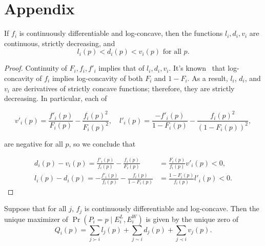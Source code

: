 \section*{Appendix}
\begingroup
\def\thetheorem{\ref{lem:decrease}}
\begin{lemma}
If $f_i$ is continuously differentiable and log-concave, then the functions $l_i,d_i,v_i$ are continuous, strictly decreasing, and
\[l_i(p) < d_i(p) < v_i(p) \text{ for all }p.\]
\end{lemma}
\addtocounter{theorem}{-1}
\endgroup
\begin{proof}
Continuity of $F_i,f_i,f'_i$ implies that of $l_i,d_i,v_i$. It's known~\cite{concave} that log-concavity of $f_i$ implies log-concavity of both $F_i$ and $1-F_i$. As a result, $l_i$, $d_i$, and $v_i$ are derivatives of strictly concave functions; therefore, they are strictly decreasing. In particular, each of

\[v'_i(p) = \frac{f'_i(p)}{F_i(p)} - \frac{f_i(p)^2}{F_i(p)^2},\quad
l'_i(p) = \frac{-f'_i(p)}{1-F_i(p)} - \frac{f_i(p)^2}{(1-F_i(p))^2},\]

are negative for all $p$, so we conclude that

\begin{align*}
d_i(p) - v_i(p)
= \frac{f'_i(p)}{f_i(p)} - \frac{f_i(p)}{F_i(p)}
&= \frac{F_i(p)}{f_i(p)} v'_i(p)
< 0,
\\l_i(p) - d_i(p)
= -\frac{f'_i(p)}{f_i(p)} -\frac{f_i(p)}{1-F_i(p)}
&= \frac{1-F_i(p)}{f_i(p)} l'_i(p)
< 0.
\end{align*}

\end{proof}

\begingroup
\def\thetheorem{\ref{thm:uniq-max}}
\begin{theorem}
Suppose that for all $j$, $f_j$ is continuously differentiable and log-concave. Then the unique maximizer of $\Pr(P_i=p\mid E^L_i,E^W_i)$ is given by the unique zero of
\[Q_i(p) = \sum_{j \succ i} l_j(p) + \sum_{j \sim i} d_j(p) + \sum_{j \prec i} v_j(p).\]
\end{theorem}
\addtocounter{theorem}{-1}
\endgroup

